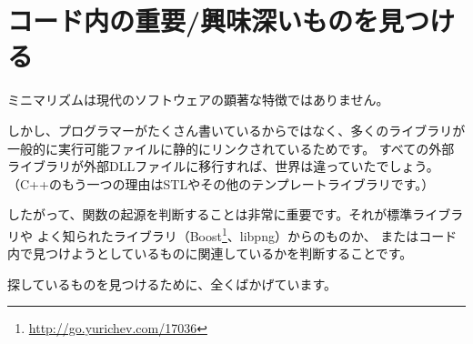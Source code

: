 \chapter{コード内の重要/興味深いものを見つける}

ミニマリズムは現代のソフトウェアの顕著な特徴ではありません。


しかし、プログラマーがたくさん書いているからではなく、多くのライブラリが一般的に実行可能ファイルに静的にリンクされているためです。
すべての外部ライブラリが外部DLLファイルに移行すれば、世界は違っていたでしょう。
（C++のもう一つの理由は\ac{STL}やその他のテンプレートライブラリです。）

\newcommand{\FOOTNOTEBOOST}{\footnote{\url{http://go.yurichev.com/17036}}}
\newcommand{\FOOTNOTELIBPNG}{\footnote{\url{http://go.yurichev.com/17037}}}

したがって、関数の起源を判断することは非常に重要です。それが標準ライブラリや
よく知られたライブラリ（Boost\FOOTNOTEBOOST、libpng）からのものか、
またはコード内で見つけようとしているものに関連しているかを判断することです。

探しているものを見つけるために、全くばかげています。